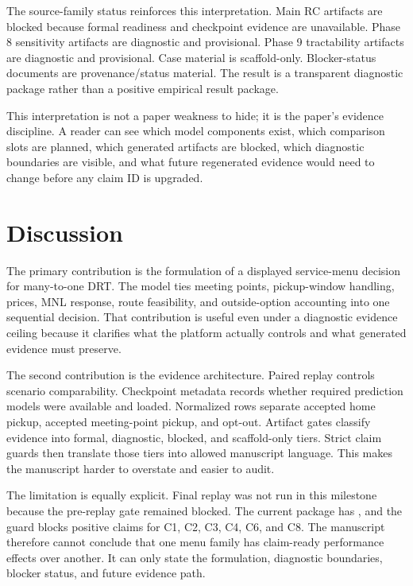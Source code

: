 \documentclass[a4paper,fleqn,review]{cas-dc}
\newcommand{\code}[1]{\texttt{\detokenize{#1}}}
\begin{document}
The source-family status reinforces this interpretation. Main RC artifacts
are blocked because formal readiness and checkpoint evidence are unavailable.
Phase 8 sensitivity artifacts are diagnostic and provisional. Phase 9
tractability artifacts are diagnostic and provisional. Case material is
scaffold-only. Blocker-status documents are provenance/status material. The
result is a transparent diagnostic package rather than a positive empirical
result package.

This interpretation is not a paper weakness to hide; it is the paper's
evidence discipline. A reader can see which model components exist, which
comparison slots are planned, which generated artifacts are blocked, which
diagnostic boundaries are visible, and what future regenerated evidence would
need to change before any claim ID is upgraded.

\section{Discussion}

The primary contribution is the formulation of a displayed service-menu
decision for many-to-one DRT. The model ties meeting points, pickup-window
handling, prices, MNL response, route feasibility, and outside-option
accounting into one sequential decision. That contribution is useful even
under a diagnostic evidence ceiling because it clarifies what the platform
actually controls and what generated evidence must preserve.

The second contribution is the evidence architecture. Paired replay controls
scenario comparability. Checkpoint metadata records whether required
prediction models were available and loaded. Normalized rows separate accepted
home pickup, accepted meeting-point pickup, and opt-out. Artifact gates
classify evidence into formal, diagnostic, blocked, and scaffold-only tiers.
Strict claim guards then translate those tiers into allowed manuscript
language. This makes the manuscript harder to overstate and easier to audit.

The limitation is equally explicit. Final replay was not run in this
milestone because the pre-replay gate remained blocked. The current package
has \code{claim_ready=false}, and the guard blocks positive claims for C1,
C2, C3, C4, C6, and C8. The manuscript therefore cannot conclude that one menu
family has claim-ready performance effects over another. It can only state the
formulation, diagnostic boundaries, blocker status, and future evidence path.
\end{document}
